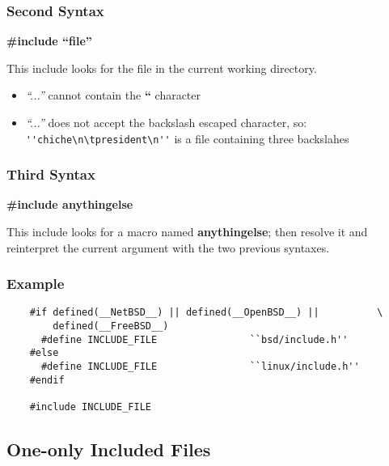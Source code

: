 
\begin{frame}[containsverbatim]
  \frametitle{Second Syntax}

  \textbf{\#include ``file''}

  \nl

  This include looks for the file in the current working directory.

  \begin{itemize}
  \item
    \textit{``...''} cannot contain the \textbf{``} character
  \item
    \textit{``...''} does not accept the backslash escaped character,
    so: \verb|''chiche\n\tpresident\n''| is a file containing
    three backslahes
  \end{itemize}
\end{frame}


\begin{frame}[containsverbatim]
  \frametitle{Third Syntax}

  \textbf{\#include anythingelse}

  \nl

  This include looks for a macro named \textbf{anythingelse}; then resolve
  it and reinterpret the current argument with the two previous syntaxes.
\end{frame}


\begin{frame}[containsverbatim]
  \frametitle{Example}

  \begin{verbatim}
    #if defined(__NetBSD__) || defined(__OpenBSD__) ||          \
        defined(__FreeBSD__)
      #define INCLUDE_FILE                ``bsd/include.h''
    #else
      #define INCLUDE_FILE                ``linux/include.h''
    #endif

    #include INCLUDE_FILE
  \end{verbatim}
\end{frame}

%
%

\subsection{One-only Included Files}



